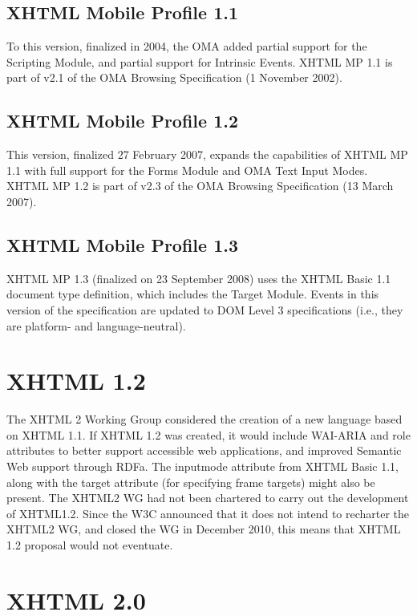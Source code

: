 \subsection{XHTML Mobile Profile 1.1}

To this version, finalized in 2004, the OMA added partial support for the Scripting Module, and partial support for Intrinsic Events. XHTML MP 1.1 is part of v2.1 of the OMA Browsing Specification (1 November 2002).




\subsection{XHTML Mobile Profile 1.2}

This version, finalized 27 February 2007, expands the capabilities of XHTML MP 1.1 with full support for the Forms Module and OMA Text Input Modes. XHTML MP 1.2 is part of v2.3 of the OMA Browsing Specification (13 March 2007).


\subsection{XHTML Mobile Profile 1.3}

XHTML MP 1.3 (finalized on 23 September 2008) uses the XHTML Basic 1.1 document type definition, which includes the Target Module. Events in this version of the specification are updated to DOM Level 3 specifications (i.e., they are platform- and language-neutral).


\section{XHTML 1.2}

The XHTML 2 Working Group considered the creation of a new language based on XHTML 1.1. If XHTML 1.2 was created, it would include WAI-ARIA and role attributes to better support accessible web applications, and improved Semantic Web support through RDFa. The inputmode attribute from XHTML Basic 1.1, along with the target attribute (for specifying frame targets) might also be present. The XHTML2 WG had not been chartered to carry out the development of XHTML1.2. Since the W3C announced that it does not intend to recharter the XHTML2 WG, and closed the WG in December 2010, this means that XHTML 1.2 proposal would not eventuate.


\section{XHTML 2.0}



